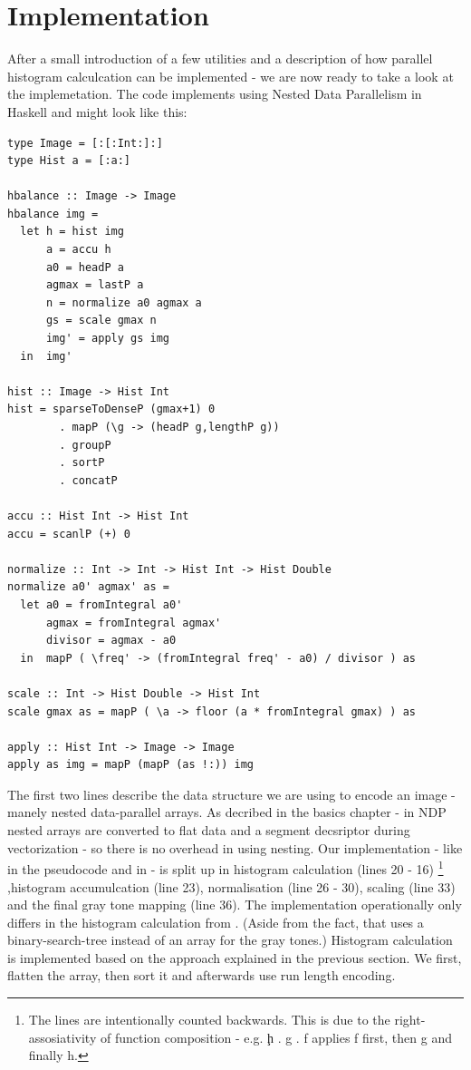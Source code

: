 \section{Implementation}
  After a small introduction of a few utilities and a description of how
  parallel histogram calculcation can be implemented - we are now ready to
  take a look at the implemetation. The code
  implements \algo using Nested Data Parallelism in Haskell and
  might look like this:
  \begin{lstlisting}
type Image = [:[:Int:]:]
type Hist a = [:a:]

hbalance :: Image -> Image
hbalance img =
  let h = hist img
      a = accu h
      a0 = headP a
      agmax = lastP a
      n = normalize a0 agmax a
      gs = scale gmax n
      img' = apply gs img
  in  img'

hist :: Image -> Hist Int
hist = sparseToDenseP (gmax+1) 0
        . mapP (\g -> (headP g,lengthP g))
        . groupP
        . sortP
        . concatP

accu :: Hist Int -> Hist Int
accu = scanlP (+) 0

normalize :: Int -> Int -> Hist Int -> Hist Double
normalize a0' agmax' as =
  let a0 = fromIntegral a0'
      agmax = fromIntegral agmax'
      divisor = agmax - a0
  in  mapP ( \freq' -> (fromIntegral freq' - a0) / divisor ) as

scale :: Int -> Hist Double -> Hist Int
scale gmax as = mapP ( \a -> floor (a * fromIntegral gmax) ) as

apply :: Hist Int -> Image -> Image
apply as img = mapP (mapP (as !:)) img
  \end{lstlisting}
  The first two lines describe the data structure we are using to encode an image - 
  manely nested data-parallel arrays.
  As decribed in the basics chapter - in NDP
  nested arrays are converted to flat data and a segment decsriptor
  during vectorization - so there is no overhead in using nesting.
  Our implementation - like in the pseudocode and in \seq - 
  is split up in histogram calculation (lines 20 - 16)
  \footnote{The lines are intentionally counted backwards. This is due to the right-assosiativity of function composition - e.g. \c{h . g . f} applies f first, then g and finally h.}
  ,histogram accumulcation (line 23), normalisation (line 26 - 30),
  scaling (line 33) and the final gray tone mapping (line 36).
  The implementation operationally only differs in the histogram calculation from \seq.
  (Aside from the fact, that \seq uses a binary-search-tree instead of an array
  for the gray tones.)
  Histogram calculation is implemented based on the approach explained in the
  previous section. We first, flatten the array, then sort it and afterwards
  use run length encoding.
  
